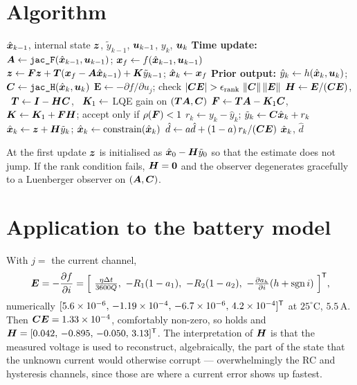 \section{Algorithm}
\begin{algorithm}[H]
\caption{UIO --- one sampling period}
\begin{algorithmic}[1]
\Require $\hat{\bm{x}}_{k-1}$, internal state $\bm{z}$, $\tilde{y}_{k-1}$, $\bm{u}_{k-1}$, $y_k$, $\bm{u}_k$
\State \textbf{Time update:} $\bm{A} \gets \texttt{jac\_F}(\hat{\bm{x}}_{k-1},\bm{u}_{k-1})$; \quad $\bm{x}_f \gets f(\hat{\bm{x}}_{k-1},\bm{u}_{k-1})$
\State $\bm{z} \gets \bm{F}\bm{z} + \bm{T}(\bm{x}_f - \bm{A}\hat{\bm{x}}_{k-1}) + \bm{K}\tilde{y}_{k-1}$; \quad $\hat{\bm{x}}_k \gets \bm{x}_f$ 
\State \textbf{Prior output:} $\hat{y}_k \gets h(\hat{\bm{x}}_k,\bm{u}_k)$; \quad $\bm{C}\gets\texttt{jac\_H}(\hat{\bm{x}}_k,\bm{u}_k)$
  \State $\bm{E} \gets -\partial f/\partial u_j$; \quad check $|\bm{C}\bm{E}| > \epsilon_{\mathrm{rank}}\,\left\lVert \bm{C} \right\rVert\left\lVert \bm{E} \right\rVert$
  \State $\bm{H} \gets \bm{E}/(\bm{C}\bm{E})$, \ $\bm{T} \gets \bm{I}-\bm{H}\bm{C}$, \ $\bm{K}_1 \gets$ LQE gain on $(\bm{T}\bm{A},\bm{C})$
  \State $\bm{F} \gets \bm{T}\bm{A}-\bm{K}_1\bm{C}$, \ $\bm{K} \gets \bm{K}_1+\bm{F}\bm{H}$; accept only if $\rho(\bm{F})<1$
\EndIf
\State $r_k \gets y_k - \hat{y}_k$; \quad $\tilde{y}_k \gets \bm{C}\hat{\bm{x}}_k + r_k$
\State $\hat{\bm{x}}_k \gets \bm{z} + \bm{H}\tilde{y}_k$; \quad $\hat{\bm{x}}_k \gets \operatorname{constrain}(\hat{\bm{x}}_k)$
\State $\hat{d} \gets a\hat{d} + (1-a)\,r_k/(\bm{C}\bm{E})$
\Ensure $\hat{\bm{x}}_k$, $\hat{d}$
\end{algorithmic}
\end{algorithm}
At the first update $\bm{z}$ is initialised as $\hat{\bm{x}}_0 - \bm{H}\tilde{y}_0$ so that the estimate does
not jump.  If the rank condition fails, $\bm{H} = \bm{0}$ and the observer degenerates gracefully to
a Luenberger observer on $(\bm{A},\bm{C})$.

\section{Application to the battery model}
With $j = $ the current channel,
\begin{equation}
\bm{E} = -\frac{\partial f}{\partial i} =
\Big[\ \tfrac{\eta\dt}{3600Q},\ -R_1(1-a_1),\ -R_2(1-a_2),\ -\tfrac{\partial a_h}{\partial i}(h+\sgn i)\ \Big]^\T ,
\end{equation}
numerically $[5.6\times10^{-6},\,-1.19\times10^{-4},\,-6.7\times10^{-6},\,4.2\times10^{-4}]^{\mathsf{T}}$ at
$25^\circ$C, $5.5$\,A.  Then $\bm{C}\bm{E} = 1.33\times10^{-4}$, comfortably non-zero, so
 holds and
$\bm{H} = [0.042,\,-0.895,\,-0.050,\,3.13]^{\mathsf{T}}$.  The interpretation of $\bm{H}$ is that the measured
voltage is used to reconstruct, algebraically, the part of the state that the unknown current
would otherwise corrupt --- overwhelmingly the RC and hysteresis channels, since those are where
a current error shows up fastest.


